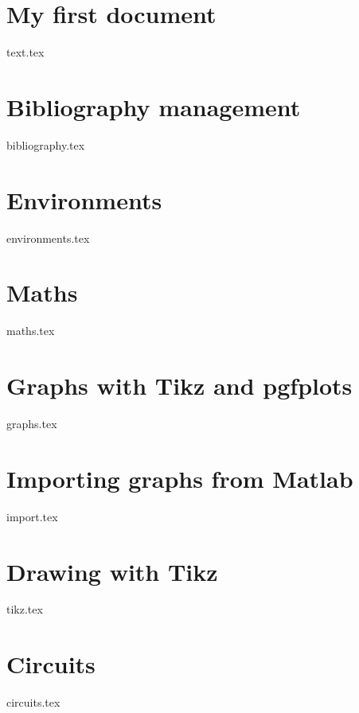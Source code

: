 \section{My first document}
    {text.tex}
\section{Bibliography management}
    {bibliography.tex}
\section{Environments}
    {environments.tex}
\section{Maths}
    {maths.tex}
\section{Graphs with Tikz and pgfplots}
    {graphs.tex}
\section{Importing graphs from Matlab}
    {import.tex}
\section{Drawing with Tikz}
    {tikz.tex}
\section{Circuits}
    {circuits.tex}